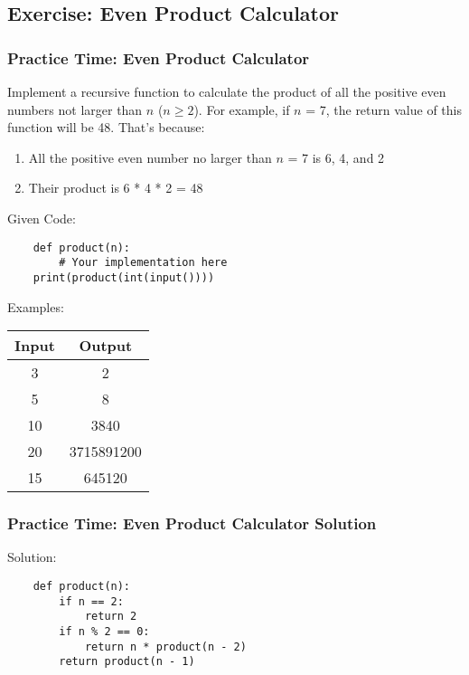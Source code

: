 \documentclass{beamer}
\begin{document}
\subsection{Exercise: Even Product Calculator}
\begin{frame}[fragile]
    \frametitle{Practice Time: Even Product Calculator}

    Implement a recursive function to calculate the product of
    all the positive even numbers not larger than $n$ ($n \ge 2$).
    For example, if $n$ = 7, the return value of this function will be 48.
    That’s because:
    \begin{enumerate}
        \item All the positive even number no larger than $n$ = 7 is 6, 4, and 2
        \item Their product is 6 * 4 * 2 = 48
    \end{enumerate}
    Given Code:
    \begin{verbatim}
    def product(n):
        # Your implementation here
    print(product(int(input())))
    \end{verbatim}
    Examples:

    \begin{center}
        \small
        \begin{tabular}{|c|c|}
            \hline
            Input & Output     \\ \hline
            3     & 2          \\ \hline
            5     & 8          \\ \hline
            10    & 3840       \\ \hline
            20    & 3715891200 \\ \hline
            15    & 645120     \\ \hline
        \end{tabular}
    \end{center}
\end{frame}

\begin{frame}[fragile]
    \frametitle{Practice Time: Even Product Calculator Solution}

    Solution:
    \begin{verbatim}
    def product(n):
        if n == 2:
            return 2
        if n % 2 == 0:
            return n * product(n - 2)
        return product(n - 1)
    \end{verbatim}
\end{frame}
\end{document}
